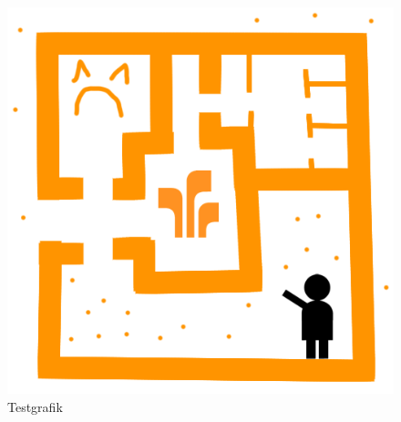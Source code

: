 \begin{figure}[h]
	\centering
	\includegraphics[scale=0.5]{images/test.png}
	\caption{Testgrafik}
	\label{level_1}
\end{figure}


